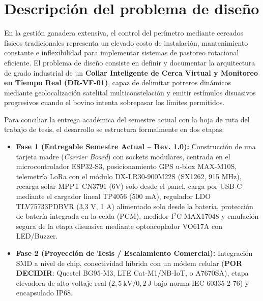 \section*{Descripción del problema de diseño}

En la gestión ganadera extensiva, el control del perímetro mediante cercados físicos tradicionales representa un elevado costo de instalación, mantenimiento constante e inflexibilidad para implementar sistemas de pastoreo rotacional eficiente. El problema de diseño consiste en definir y documentar la arquitectura de grado industrial de un \textbf{Collar Inteligente de Cerca Virtual y Monitoreo en Tiempo Real (DR-VF-01)}, capaz de delimitar potreros dinámicos mediante geolocalización satelital multiconstelación y emitir estímulos disuasivos progresivos cuando el bovino intenta sobrepasar los límites permitidos.

Para conciliar la entrega académica del semestre actual con la hoja de ruta del trabajo de tesis, el desarrollo se estructura formalmente en dos etapas:
\begin{itemize}[leftmargin=*]
    \item \textbf{Fase 1 (Entregable Semestre Actual -- Rev. 1.0):} Construcción de una tarjeta madre (\emph{Carrier Board}) con sockets modulares, centrada en el microcontrolador ESP32-S3, posicionamiento GPS u-blox MAX-M10S, telemetría LoRa con el módulo DX-LR30-900M22S (SX1262, 915 MHz), recarga solar MPPT CN3791 (6V) solo desde el panel, carga por USB-C mediante el cargador lineal TP4056 (500 mA), regulador LDO TLV75733PDBVR (3,3 V, 1 A) alimentado solo desde la batería, protección de batería integrada en la celda (PCM), medidor I$^2$C MAX17048 y emulación segura de la etapa disuasiva mediante optoacoplador VO617A con LED/Buzzer.
    \item \textbf{Fase 2 (Proyección de Tesis / Escalamiento Comercial):} Integración SMD a nivel de chip, conectividad híbrida con un módem celular (\textbf{POR DECIDIR}: Quectel BG95-M3, LTE Cat-M1/NB-IoT, o A7670SA), etapa elevadora de alto voltaje real ($2,5~\text{kV} / 0,2~\text{J}$ bajo norma IEC 60335-2-76) y encapsulado IP68.
\end{itemize}

